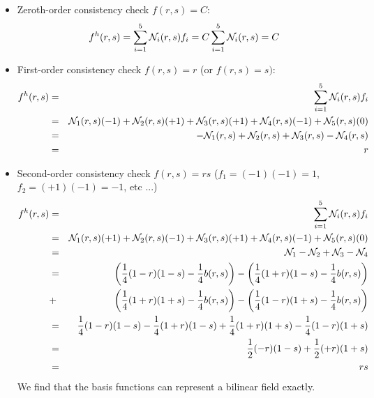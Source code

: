 \begin{itemize}
\item
Zeroth-order consistency check $f(r,s)=C$:
\begin{equation}
f^h(r,s) 
= \sum_{i=1}^5 {\mathcal{N}}_i(r,s) f_i \\
= C \sum_{i=1}^5 {\mathcal{N}}_i(r,s)  \\
= C
\end{equation}

\item
First-order consistency check $f(r,s)=r$ (or $f(r,s)=s)$:
\begin{eqnarray}
f^h(r,s) 
&=& \sum_{i=1}^5 {\mathcal{N}}_i(r,s) f_i \nonumber\\
&=& {\mathcal{N}}_1(r,s) (-1) + {\mathcal{N}}_2(r,s) (+1) + {\mathcal{N}}_3(r,s) (+1) + {\mathcal{N}}_4(r,s) (-1) + {\mathcal{N}}_5(r,s) (0) \nonumber\\
&=& -{\mathcal{N}}_1(r,s)+{\mathcal{N}}_2(r,s)+{\mathcal{N}}_3(r,s)-{\mathcal{N}}_4(r,s) \nonumber\\
&=& r
\end{eqnarray}

\item
Second-order consistency check $f(r,s)=rs$ ($f_1=(-1)(-1)=1$, $f_2=(+1)(-1)=-1$, etc ...)
\begin{eqnarray}
f^h(r,s) 
&=& \sum_{i=1}^5 {\mathcal{N}}_i(r,s) f_i \nonumber\\
&=& {\mathcal{N}}_1(r,s) (+1) + {\mathcal{N}}_2(r,s) (-1) + {\mathcal{N}}_3(r,s) (+1) + {\mathcal{N}}_4(r,s) (-1) + {\mathcal{N}}_5(r,s) (0) \nonumber\\
&=& {\mathcal{N}}_1-{\mathcal{N}}_2+{\mathcal{N}}_3-{\mathcal{N}}_4 \nonumber\\
&=& 
\left(\frac{1}{4}(1-r)(1-s)-\frac{1}{4}b(r,s)\right)
-\left(\frac{1}{4}(1+r)(1-s)-\frac{1}{4}b(r,s)\right) \nonumber\\
&+& 
\left(\frac{1}{4}(1+r)(1+s)-\frac{1}{4}b(r,s)\right)
-\left(\frac{1}{4}(1-r)(1+s)-\frac{1}{4}b(r,s)\right) \nonumber\\
&=& 
 \frac{1}{4}(1-r)(1-s)
-\frac{1}{4}(1+r)(1-s)
+\frac{1}{4}(1+r)(1+s)
-\frac{1}{4}(1-r)(1+s) \nonumber\\
&=&
 \frac{1}{2}(-r)(1-s)
+\frac{1}{2}(+r)(1+s) \nonumber\\
&=& rs
\end{eqnarray}
We find that the basis functions can represent  a bilinear field exactly. 




\end{itemize}
